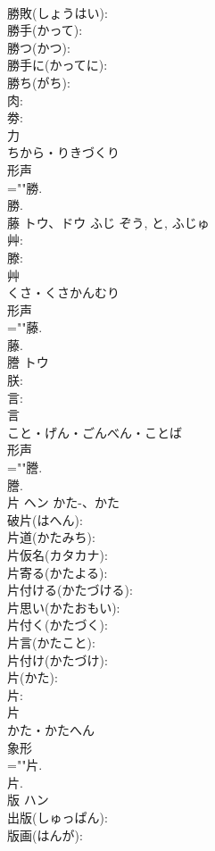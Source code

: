 \documentclass[8pt]{extreport}
\begin{document}
\begin{CJK}{UTF8}{min}
\\	勝敗(しょうはい): 
\\	勝手(かって): 
\\	勝つ(かつ): 
\\	勝手に(かってに): 
\\	勝ち(がち): 
\\	肉: 
\\	劵: 
\\	力	
\\	ちから・りきづくり	
\\	形声 
\\	=""勝.
\\	勝.
\\	藤	トウ、ドウ	ふじ	ぞう, と, ふじゅ	
\\	艸: 
\\	滕: 
\\	艸	
\\	くさ・くさかんむり	
\\	形声 
\\	=""藤.
\\	藤.
\\	謄	トウ			
\\	朕: 
\\	言: 
\\	言	
\\	こと・げん・ごんべん・ことば	
\\	形声 
\\	=""謄.
\\	謄.
\\	片	ヘン	かた-、かた		
\\	破片(はへん): 
\\	片道(かたみち): 
\\	片仮名(カタカナ): 
\\	片寄る(かたよる): 
\\	片付ける(かたづける): 
\\	片思い(かたおもい): 
\\	片付く(かたづく): 
\\	片言(かたこと): 
\\	片付け(かたづけ): 
\\	片(かた): 
\\	片: 
\\	片	
\\	かた・かたへん	
\\	象形 
\\	=""片.
\\	片.
\\	版	ハン			
\\	出版(しゅっぱん): 
\\	版画(はんが): 

\end{CJK}
\end{document}
